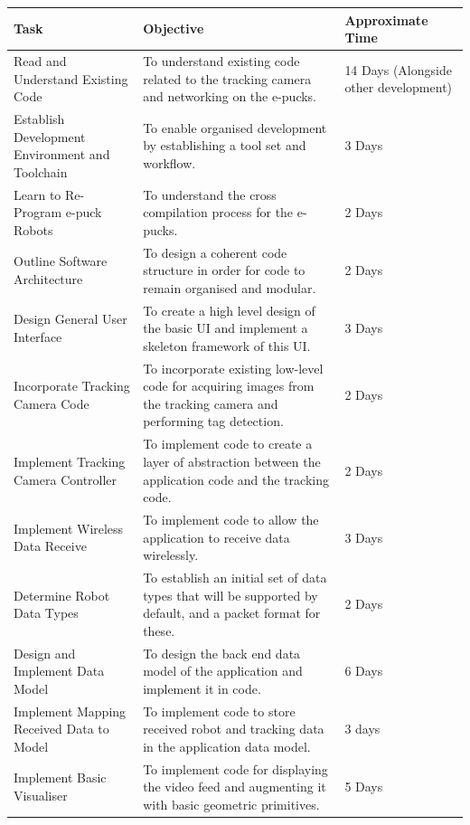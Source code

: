 \documentclass[hidelinks,10pt]{article}
\begin{document}
\begin{table}[H]
\begin{tabular}[h]{ |>{\raggedright}p{5cm}|>{\raggedright}p{7cm}|p{3cm}| }
  \hline
  Task & Objective & Approximate Time \\\hline
  Read and Understand Existing Code 				& To understand existing code related to the tracking camera and networking on the e-pucks. 							& 14 Days (Alongside other development)\\ \hline
  Establish Development Environment and Toolchain 	& To enable organised development by establishing a tool set and workflow. 												& 3 Days \\ \hline
  Learn to Re-Program e-puck Robots 				& To understand the cross compilation process for the e-pucks. 															& 2 Days \\ \hline
  Outline Software Architecture 					& To design a coherent code structure in order for code to remain organised and modular. 								& 2 Days \\ \hline
  Design General User Interface 					& To create a high level design of the basic UI and implement a skeleton framework of this UI.							& 3 Days \\ \hline
  Incorporate Tracking Camera Code 					& To incorporate existing low-level code for acquiring images from the tracking camera and performing tag detection. 	& 2 Days \\ \hline
  Implement Tracking Camera Controller 				& To implement code to create a layer of abstraction between the application code and the tracking code. 				& 2 Days \\ \hline
  Implement Wireless Data Receive 					& To implement code to allow the application to receive data wirelessly. 												& 3 Days \\ \hline
  Determine Robot Data Types 						& To establish an initial set of data types that will be supported by default, and a packet format for these. 			& 2 Days \\ \hline
  Design and Implement Data Model 					& To design the back end data model of the application and implement it in code.										& 6 Days \\ \hline
  Implement Mapping Received Data to Model 			& To implement code to store received robot and tracking data in the application data model. 							& 3 days \\ \hline
  Implement Basic Visualiser 						& To implement code for displaying the video feed and augmenting it with basic geometric primitives. 					& 5 Days \\ \hline

\end{tabular}
\end{table}
\end{document}
